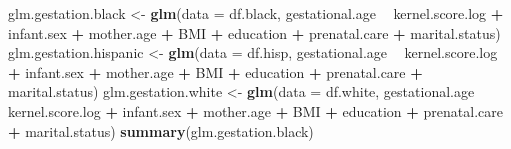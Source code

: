 \documentclass[
  12pt,
]{article}
\newenvironment{Shaded}{\begin{snugshade}}{\end{snugshade}}
\newcommand{\DataTypeTok}[1]{\textcolor[rgb]{0.13,0.29,0.53}{#1}}
\newcommand{\KeywordTok}[1]{\textcolor[rgb]{0.13,0.29,0.53}{\textbf{#1}}}
\newcommand{\NormalTok}[1]{#1}
\newcommand{\OperatorTok}[1]{\textcolor[rgb]{0.81,0.36,0.00}{\textbf{#1}}}
\newcommand{\StringTok}[1]{\textcolor[rgb]{0.31,0.60,0.02}{#1}}
\begin{document}
\begin{Shaded}
\begin{Highlighting}[]
\NormalTok{glm.gestation.black <-}\StringTok{ }\KeywordTok{glm}\NormalTok{(}\DataTypeTok{data =}\NormalTok{ df.black, }
\NormalTok{                           gestational.age }\OperatorTok{~}\StringTok{ }\NormalTok{kernel.score.log }\OperatorTok{+}\StringTok{ }\NormalTok{infant.sex }\OperatorTok{+}\StringTok{ }\NormalTok{mother.age }\OperatorTok{+}\StringTok{ }
\StringTok{                             }\NormalTok{BMI }\OperatorTok{+}\StringTok{ }\NormalTok{education }\OperatorTok{+}\StringTok{ }\NormalTok{prenatal.care }\OperatorTok{+}\StringTok{ }\NormalTok{marital.status)}
\NormalTok{glm.gestation.hispanic <-}\StringTok{ }\KeywordTok{glm}\NormalTok{(}\DataTypeTok{data =}\NormalTok{ df.hisp, }
\NormalTok{                           gestational.age }\OperatorTok{~}\StringTok{ }\NormalTok{kernel.score.log }\OperatorTok{+}\StringTok{ }\NormalTok{infant.sex }\OperatorTok{+}\StringTok{ }\NormalTok{mother.age }\OperatorTok{+}\StringTok{ }
\StringTok{                             }\NormalTok{BMI }\OperatorTok{+}\StringTok{ }\NormalTok{education }\OperatorTok{+}\StringTok{ }\NormalTok{prenatal.care }\OperatorTok{+}\StringTok{ }\NormalTok{marital.status)}
\NormalTok{glm.gestation.white <-}\StringTok{ }\KeywordTok{glm}\NormalTok{(}\DataTypeTok{data =}\NormalTok{ df.white, }
\NormalTok{                           gestational.age }\OperatorTok{~}\StringTok{ }\NormalTok{kernel.score.log }\OperatorTok{+}\StringTok{ }\NormalTok{infant.sex }\OperatorTok{+}\StringTok{ }\NormalTok{mother.age }\OperatorTok{+}\StringTok{ }
\StringTok{                             }\NormalTok{BMI }\OperatorTok{+}\StringTok{ }\NormalTok{education }\OperatorTok{+}\StringTok{ }\NormalTok{prenatal.care }\OperatorTok{+}\StringTok{ }\NormalTok{marital.status)}
\KeywordTok{summary}\NormalTok{(glm.gestation.black)}
\end{Highlighting}
\end{Shaded}
\end{document}
